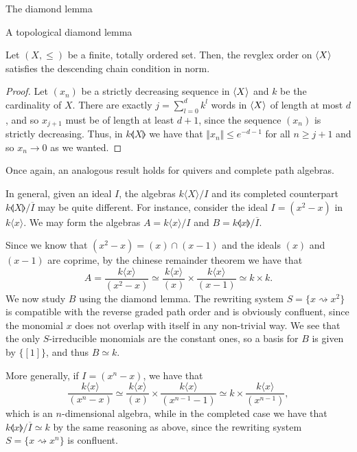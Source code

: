\begin{chapter}{The diamond lemma}
\begin{section}{A topological diamond lemma}
\begin{lemma}\label{noeth-norm}Let $(X,\leq)$ be a finite, totally ordered set. Then, the revglex order on $\langle X\rangle$ satisfies the descending chain condition in norm.
\end{lemma}
\begin{proof} Let $(x_n)$ be a strictly decreasing sequence in $\langle X\rangle$ and $k$ be the cardinality of $X$. There are exactly $j=\sum_{l=0}^d k^l$ words in $\langle X\rangle$ of length at most $d$, and so $x_{j+1}$ must be of length at least $d+1$, since the sequence $(x_n)$ is strictly decreasing. Thus, in $k\llangle X\rrangle$ we have that $\Vert x_{n}\Vert\leq e^{-d-1}$ for all $n\geq j+1$ and so $x_n\rightarrow 0$ as we wanted.
\end{proof}

Once again, an analogous result holds for quivers and complete path algebras.

\begin{exmp}\label{counterexample} In general, given an ideal $I$, the algebras $k\langle X\rangle/I$ and its completed counterpart $k\llangle X\rrangle/\overline{I}$ may be quite different. For instance, consider the ideal $I=(x^2-x)$ in $k\langle x \rangle$. We may form the algebras $A=k\langle x\rangle/I$ and $B=k\llangle x\rrangle/\overline{I}$.

Since we know that $(x^2-x)=(x)\cap(x-1)$ and the ideals $(x)$ and $(x-1)$ are coprime, by the chinese remainder theorem we have that
\[A=\frac{k\langle x\rangle}{(x^2-x)}\simeq \frac{k\langle x\rangle}{(x)} \times \frac{k\langle x\rangle}{(x-1)}\simeq k\times k.\]
We now study $B$ using the diamond lemma. The rewriting system $S=\{x\rightsquigarrow x^2\}$ is compatible with the reverse graded path order and is obviously confluent, since the monomial $x$ does not overlap with itself in any non-trivial way. We see that the only $S$-irreducible monomials are the constant ones, so a basis for $B$ is given by $\{[1]\}$, and thus $B\simeq k$.

More generally, if $I=(x^n-x)$, we have that
\[\frac{k\langle x\rangle}{(x^n-x)} \simeq \frac{k\langle x\rangle}{(x)}\times \frac{k\langle x\rangle}{(x^{n-1}-1)}\simeq k \times \frac{k\langle x\rangle}{(x^{n-1})},\]
which is an $n$-dimensional algebra, while in the completed case we have that $k\llangle x\rrangle/\overline{I}\simeq k$ by the same reasoning as above, since the rewriting system $S=\{x\rightsquigarrow x^n\}$ is confluent.
\end{exmp}
\end{section}
\end{chapter}